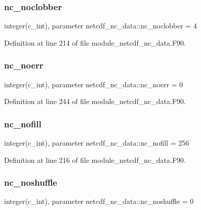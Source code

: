 \subsubsection{\texorpdfstring{nc\+\_\+noclobber}{nc\_noclobber}}
{\footnotesize\ttfamily integer(c\+\_\+int), parameter netcdf\+\_\+nc\+\_\+data\+::nc\+\_\+noclobber = 4}



Definition at line 214 of file module\+\_\+netcdf\+\_\+nc\+\_\+data.\+F90.

\mbox{\label{namespacenetcdf__nc__data_a0717db7f9709d4adc72382fbe6ac2e28}} 
\subsubsection{\texorpdfstring{nc\+\_\+noerr}{nc\_noerr}}
{\footnotesize\ttfamily integer(c\+\_\+int), parameter netcdf\+\_\+nc\+\_\+data\+::nc\+\_\+noerr = 0}



Definition at line 244 of file module\+\_\+netcdf\+\_\+nc\+\_\+data.\+F90.

\mbox{\label{namespacenetcdf__nc__data_a91a7bc224294e11fb792e4c54ea2f491}} 
\subsubsection{\texorpdfstring{nc\+\_\+nofill}{nc\_nofill}}
{\footnotesize\ttfamily integer(c\+\_\+int), parameter netcdf\+\_\+nc\+\_\+data\+::nc\+\_\+nofill = 256}



Definition at line 216 of file module\+\_\+netcdf\+\_\+nc\+\_\+data.\+F90.

\mbox{\label{namespacenetcdf__nc__data_ace951380dd41179847dfd7a26a9cac39}} 
\subsubsection{\texorpdfstring{nc\+\_\+noshuffle}{nc\_noshuffle}}
{\footnotesize\ttfamily integer(c\+\_\+int), parameter netcdf\+\_\+nc\+\_\+data\+::nc\+\_\+noshuffle = 0}




